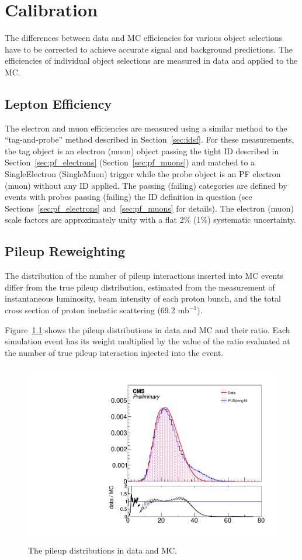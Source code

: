 \chapter{Calibration}
\label{chap:calibration}

The differences between data and MC efficiencies for various object selections have to be corrected to achieve accurate signal and background predictions.
The efficiencies of individual object selections are measured in data and applied to the MC.

\section{Lepton Efficiency}
\label{sec:lepton_eff}

The electron and muon efficiencies are measured using a similar method to the ``tag-and-probe'' method described in Section~\ref{sec:idsf}.
For these measurements, the tag object is an electron (muon) object passing the tight ID described in Section~\ref{sec:pf_electrons} (Section~\ref{sec:pf_muons}) and matched to a SingleElectron (SingleMuon) trigger while the probe object is an PF electron (muon) without any ID applied.
The passing (failing) categories are defined by events with probes passing (failing) the ID definition in question (see Sections~\ref{sec:pf_electrons} and~\ref{sec:pf_muons} for details).
The electron (muon) scale factors are approximately unity with a flat 2\% (1\%) systematic uncertainty.


\section{Pileup Reweighting}
\label{sec:puweight}

The distribution of the number of pileup interactions inserted into MC events differ from the true pileup distribution, estimated from the measurement of instantaneous luminosity, beam intensity of each proton bunch, and the total cross section of proton inelastic scattering (69.2 $\textrm{mb}^{-1}$).

Figure~\ref{fig:pudist} shows the pileup distributions in data and MC and their ratio. 
Each simulation event has its weight multiplied by the value of the ratio evaluated at the number of true pileup interaction injected into the event.

\begin{figure}[htbp]
  \centering
  \includegraphics[width=0.48\linewidth]{Calibration/Figures/PUMoriond17.pdf}
  \caption{
    The pileup distributions in data and MC.
  }
  \label{fig:pudist}
\end{figure}


